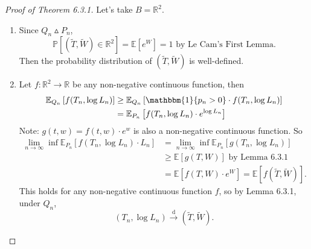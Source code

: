 \documentclass[a4paper]{article}
\begin{document}
\begin{eg}
	\begin{proof}[Proof of Theorem 6.3.1]
		Let's take $B = \mathbb{R}^2$. 
		\begin{enumerate}
			\item Since $Q_n \vartriangle P_n$,
			\begin{equation*}
				\mathbb{P}\left[(\tilde{T},\tilde{W}) \in \mathbb{R}^2\right] = \mathbb{E}\left[e^W\right] = 1 \text{ by Le Cam's First Lemma.}
			\end{equation*}
			Then the probability distribution of $(\tilde{T},\tilde{W})$ is well-defined.
			\item Let $f: \mathbb{R}^2 \to \mathbb{R}$ be any non-negative continuous function, then
			\begin{equation*}
				\begin{aligned}
					\mathbb{E}_{Q_n}\left[f(T_n,\log L_n)\right] &\geq \mathbb{E}_{Q_n} \left[\mathbbm{1} \{p_n > 0\} \cdot f(T_n,\log L_n)\right] \\
					&= \mathbb{E}_{P_n} \left[f(T_n,\log L_n) \cdot e^{\log L_n}\right]
				\end{aligned}
			\end{equation*}
			Note: $g(t,w) = f(t,w) \cdot e^w$ is also a non-negative continuous function. So
			\begin{equation*}
				\begin{aligned}
					\lim\limits_{n \to \infty} \inf \mathbb{E}_{P_n} \left[f(T_n,\log L_n) \cdot L_n\right] &= \lim\limits_{n \to \infty} \inf \mathbb{E}_{P_n} \left[g(T_n,\log L_n)\right] \\
					&\geq \mathbb{E}[g(T,W)] \text{ by Lemma 6.3.1} \\
					&= \mathbb{E}\left[f(T,W) \cdot e^W\right] = \mathbb{E}\left[f(\tilde{T},\tilde{W})\right].
				\end{aligned}
			\end{equation*}
			This holds for any non-negative continuous function $f$, so by Lemma 6.3.1, under $Q_n$,
			\begin{equation*}
				(T_n,\log L_n) \stackrel{\text{d}}{\longrightarrow} (\tilde{T},\tilde{W}).
			\end{equation*}
		\end{enumerate}
	\end{proof}
	

\end{eg}
\end{document}
